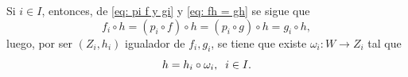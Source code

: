 \documentclass[10pt]{article}
\newtheorem[M]{teo}{Teorema}[section]
\newtheorem[M]{listaObj}[teo]{Lista de deseos}
\newtheorem[M]{preg}[teo]{Pregunta}
\newtheorem[M]{lema}[teo]{Lema}
\newtheorem[M]{hip}[teo]{Hipótesis}
\newtheorem[M]{prop}[teo]{Proposición}
\newtheorem[M]{obs}[teo]{Observación}
\newtheorem[M]{cor}[teo]{Corolario}
\newtheorem[M]{notacion}[teo]{Notación}
\newtheorem[M]{nota}[teo]{Nota}
\begin{document}
\begin{center}
\begin{tikzpicture}[x=0.75pt,y=0.75pt,yscale=-1,xscale=1]
\end{tikzpicture}
\end{center}

Si $i \in I$, entonces, de \eqref{eq: pi f y gi} 
y \eqref{eq: fh = gh} se sigue que
\[
f_{i} \circ h = (p_{i} \circ f) \circ h = (p_{i} \circ g) \circ h
= g_{i} \circ h,
\]
luego, por ser $(Z_{i}, h_{i})$ igualador de $f_{i}, g_{i}$, se tiene que
existe $\omega_{i} : W \longrightarrow Z_{i}$ tal que 
\begin{equation}
	\label{eq: h = hi wi}
	h = h_{i} \circ \omega_{i}, \hspace{0.2cm} i \in I.
\end{equation}
\begin{center}
\begin{tikzpicture}[x=0.75pt,y=0.75pt,yscale=-1,xscale=1]



\end{tikzpicture}
\end{center}
\end{document}
